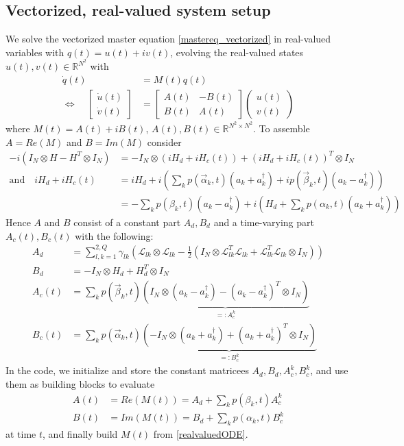 \documentclass[letterpaper]{article}
\newcommand{\Ell}{\mathcal{L}}
\newcommand{\R}{\mathds{R}}
\begin{document}
  \subsection{Vectorized, real-valued system setup}
   We solve the vectorized master equation \eqref{mastereq_vectorized} in real-valued variables with $q(t) = u(t) + iv(t)$, evolving the real-valued states $u(t), v(t)\in \R^{N^2}$ with
   \begin{align}
     \dot q(t) &= M(t) q(t) \\
   \Leftrightarrow \quad \begin{bmatrix} \dot u(t) \\ \dot v(t) \end{bmatrix} &= 
   \begin{bmatrix} A(t) & -B(t) \\ B(t) & A(t) \end{bmatrix} \begin{pmatrix} u(t) \\ v(t) \end{pmatrix} \label{realvaluedODE}
   \end{align}
   where $M(t) = A(t) + i B(t)$, $A(t), B(t)\in \R^{N^2\times N^2}$. To assemble $A = Re(M)$ and $B = Im(M)$ consider
   \begin{align}
     -i(I_N \otimes H - H^T \otimes I_N) &= -I_N \otimes \left(iH_d + iH_c(t)\right) + \left(iH_d + iH_c(t)\right)^T \otimes I_N \\
     \text{and} \quad iH_d + iH_c(t) &= i H_d + i\left( \sum_k p(\vec{\alpha}_k,t)(a_k + a_k^{\dagger}) + ip(\vec{\beta}_k,t)(a_k - a_k^{\dagger})\right) \\
                    &= - \sum_k p(\beta_k,t)(a_k - a_k^{\dagger}) + i\left( H_d + \sum_k p(\alpha_k,t)(a_k+a_k^{\dagger}) \right) 
   \end{align}
   Hence $A$ and $B$ consist of a constant part $A_d, B_d$ and a time-varying part $A_c(t), B_c(t)$ with the following:
   \begin{align}
     A_d &=  \sum_{l,k=1}^{2,Q}\gamma_{lk} \left( \Ell_{lk}\otimes\Ell_{lk} - \frac 1 2 \left(I_N \otimes \Ell_{lk}^T\Ell_{lk} + \Ell_{lk}^T\Ell_{lk}\otimes I_N\right) \right)\\
     B_d &= -I_N \otimes H_d + H_d^T \otimes I_N \\
     A_c(t) &= \sum_k p(\vec{\beta}_k,t) \underbrace{\left( I_N \otimes \left(a_k - a_k^{\dagger}\right) - \left(a_k - a_k^{\dagger}\right)^T\otimes I_N \right)}_{=:A_c^k} \\
     B_c(t) &= \sum_k p(\vec{\alpha}_k,t) \underbrace{\left( - I_N \otimes \left(a_k + a_k^{\dagger}\right) + \left(a_k + a_k^{\dagger}\right)^T\otimes I_N \right)}_{=:B_c^k} 
   \end{align}
   In the code, we initialize and store the constant matricees $A_d,B_d,A_c^k,  B_c^k$, and use them as building blocks to evaluate 
   \begin{align}
     A(t) &= Re(M(t)) = A_d + \sum_kp(\beta_k, t)A_c^k \\
     B(t) &= Im(M(t)) = B_d + \sum_k p(\alpha_k, t)B_c^k
   \end{align}
   at time $t$, and finally build $M(t)$ from \eqref{realvaluedODE}.
\end{document}
